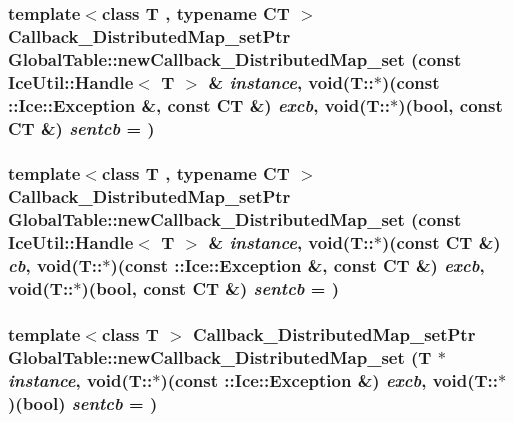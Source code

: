 \label{namespace_global_table_aba7735d6f323646d833fd862cb479c39}
\hypertarget{namespace_global_table_a774135e26623bb25e85e21050e4736dd}{
\subsubsection[{newCallback\_\-DistributedMap\_\-set}]{\setlength{\rightskip}{0pt plus 5cm}template$<$class T , typename CT $>$ {\bf Callback\_\-DistributedMap\_\-setPtr} GlobalTable::newCallback\_\-DistributedMap\_\-set (const IceUtil::Handle$<$ T $>$ \& {\em instance}, \/  void(T::$\ast$)(const ::Ice::Exception \&, const CT \&) {\em excb}, \/  void(T::$\ast$)(bool, const CT \&) {\em sentcb} = {})}}
\label{namespace_global_table_a774135e26623bb25e85e21050e4736dd}
\hypertarget{namespace_global_table_a360f94ab75c45063c44313055a16277c}{
\subsubsection[{newCallback\_\-DistributedMap\_\-set}]{\setlength{\rightskip}{0pt plus 5cm}template$<$class T , typename CT $>$ {\bf Callback\_\-DistributedMap\_\-setPtr} GlobalTable::newCallback\_\-DistributedMap\_\-set (const IceUtil::Handle$<$ T $>$ \& {\em instance}, \/  void(T::$\ast$)(const CT \&) {\em cb}, \/  void(T::$\ast$)(const ::Ice::Exception \&, const CT \&) {\em excb}, \/  void(T::$\ast$)(bool, const CT \&) {\em sentcb} = {})}}
\label{namespace_global_table_a360f94ab75c45063c44313055a16277c}
\hypertarget{namespace_global_table_a9ba899f6d4548f421c542b6887a5e7c7}{
\subsubsection[{newCallback\_\-DistributedMap\_\-set}]{\setlength{\rightskip}{0pt plus 5cm}template$<$class T $>$ {\bf Callback\_\-DistributedMap\_\-setPtr} GlobalTable::newCallback\_\-DistributedMap\_\-set (T $\ast$ {\em instance}, \/  void(T::$\ast$)(const ::Ice::Exception \&) {\em excb}, \/  void(T::$\ast$)(bool) {\em sentcb} = {})}}

